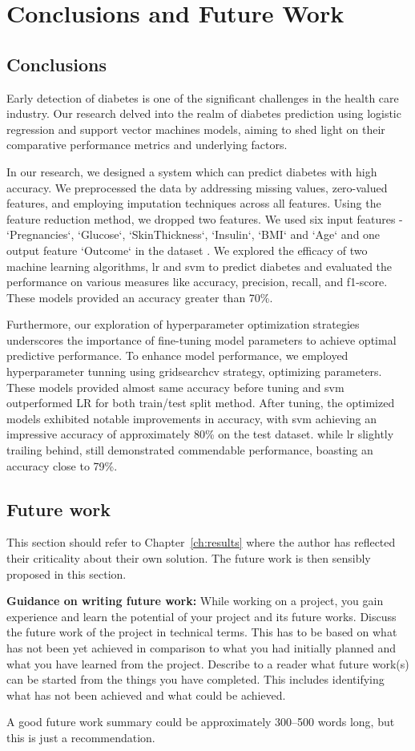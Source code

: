\chapter{Conclusions and Future Work}
\label{ch:con}
\section{Conclusions}
Early detection of diabetes is one of the significant challenges in the health care industry. Our research delved into the realm of diabetes prediction using logistic regression and support vector machines models, aiming to shed light on their comparative performance metrics and underlying factors. 

In our research, we designed a system which can predict diabetes with high accuracy. We preprocessed the data by addressing missing values, zero-valued features, and employing imputation techniques across all features. Using the feature reduction method, we dropped two features. We used six input features - `Pregnancies`, `Glucose`, `SkinThickness`, `Insulin`, `BMI` and `Age` and one output feature `Outcome` in the  dataset \citep{dataset}. We explored the efficacy of two machine learning algorithms, lr and svm to predict diabetes and evaluated the performance on various measures like accuracy, precision, recall, and f1-score. These models provided an accuracy greater than 70\%. 

Furthermore, our exploration of hyperparameter optimization strategies underscores the importance of fine-tuning model parameters to achieve optimal predictive performance. To enhance model performance, we employed hyperparameter tunning using gridsearchcv strategy, optimizing parameters. These models provided almost same accuracy before tuning and svm outperformed LR for both train/test split method. After tuning, the optimized models exhibited notable improvements in accuracy, with svm achieving an impressive accuracy of approximately 80\% on the test dataset. while lr slightly trailing behind, still demonstrated commendable performance, boasting an accuracy close to 79\%.

\section{Future work}
This section should refer to Chapter~\ref{ch:results} where the author has reflected their criticality about their own solution. The future work is then sensibly proposed in this section.

\textbf{Guidance on writing future work:} While working on a project, you gain experience and learn the potential of your project and its future works. Discuss the future work of the project in technical terms. This has to be based on what has not been yet achieved in comparison to what you had initially planned and what you have learned from the project. Describe to a reader what future work(s) can be started from the things you have completed. This includes identifying what has not been achieved and what could be achieved. 



A good future work summary could be approximately 300--500 words long, but this is just a recommendation.